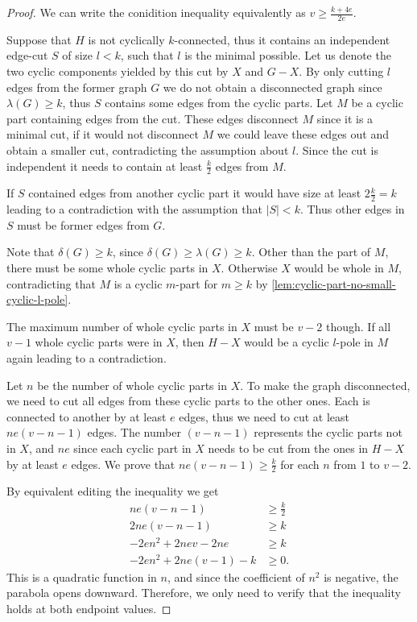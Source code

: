 \documentclass[12pt, twoside]{book}
\begin{document}
\begin{proof}
	We can write the conidition inequality equivalently as $v\geq \frac{k+4e}{2e}$.
	
	Suppose that $H$ is not cyclically $k$-connected, thus it contains an independent \mbox{edge-cut} $S$ of size $l<k$, such that $l$ is the minimal possible. Let us denote the two cyclic components yielded by this cut by $X$ and $G-X$. By only cutting $l$ edges from the former graph $G$ we do not obtain a disconnected graph since $\lambda(G)\geq k$, thus $S$ contains some edges from the cyclic parts. Let $M$ be a cyclic part containing edges from the cut. These edges disconnect $M$ since it is a minimal cut, if it would not disconnect $M$ we could leave these edges out and obtain a smaller cut, contradicting the assumption about $l$. Since the cut is independent it needs to contain at least $\frac{k}{2}$ edges from $M$.
	
	If $S$ contained edges from another cyclic part it would have size at least $2\frac{k}{2}=k$ leading to a contradiction with the assumption that $|S|<k$. Thus other edges in $S$ must be former edges from $G$.
	
	Note that $\delta(G)\geq k$, since $\delta(G)\geq \lambda(G)\geq k$. Other than the part of $M$, there must be some whole cyclic parts in $X$. Otherwise $X$ would be whole in $M$, contradicting that $M$ is a cyclic $m$-part for $m\geq k$ by \cref{lem:cyclic-part-no-small-cyclic-l-pole}.
	
	The maximum number of whole cyclic parts in $X$ must be $v-2$ though. If all $v-1$ whole cyclic parts were in $X$, then $H-X$ would be a cyclic $l$-pole in $M$ again leading to a contradiction.
	
	Let $n$ be the number of whole cyclic parts in $X$. To make the graph disconnected, we need to cut all edges from these cyclic parts to the other ones. Each is connected to another by at least $e$ edges, thus we need to cut at least $ne(v-n-1)$ edges. The number $(v-n-1)$ represents the cyclic parts not in $X$, and $ne$ since each cyclic part in $X$ needs to be cut from the ones in $H-X$ by at least $e$ edges. We prove that $ne(v-n-1)\geq\frac{k}{2}$ for each $n$ from $1$ to $v-2$.
	
	By equivalent editing the inequality we get
	\begin{align*}
		ne(v-n-1)&\geq\frac{k}{2} \\
		2ne(v-n-1)&\geq k \\
		-2en^2+2nev-2ne&\geq k \\
		-2en^2+2ne(v-1)-k&\geq 0.
	\end{align*}
	This is a quadratic function in $n$, and since the coefficient of $n^2$ is negative, the parabola opens downward. Therefore, we only need to verify that the inequality holds at both endpoint values.
	

\end{proof}
\end{document}

